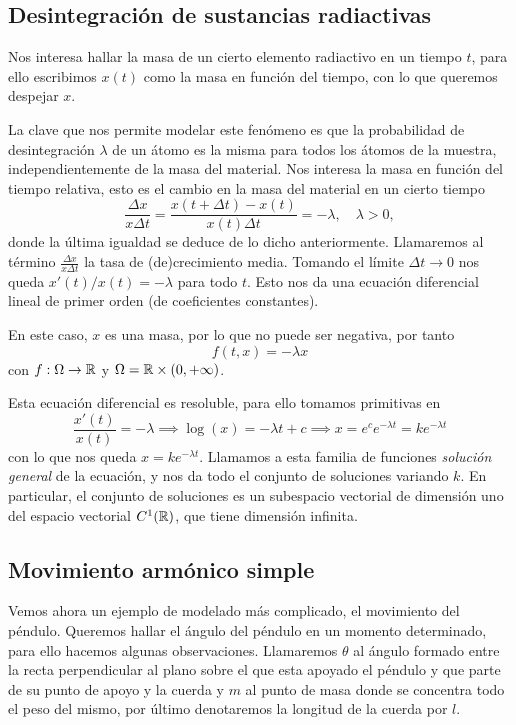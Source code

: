 \documentclass[../ecuaciones_diferenciales.tex]{subfiles}
\begin{document}
\subsection{Desintegración de sustancias radiactivas}

Nos interesa hallar la masa de un cierto elemento radiactivo en un tiempo \(t\),
para ello escribimos \(x(t)\) como la masa en función del tiempo, con lo que
queremos despejar \(x\).

La clave que nos permite modelar este fenómeno es que la probabilidad de 
desintegración \(\lambda\) de un átomo es la misma para todos los átomos de la 
muestra, independientemente de la masa del material.
Nos interesa la masa en función del tiempo relativa, esto es el cambio en la
masa del material en un cierto tiempo
\[\frac{\Delta x}{x \Delta t} = \frac{x(t + \Delta t) - x(t)}{x(t) \Delta t}
	= -\lambda, \quad \lambda > 0,\] 
donde la última igualdad se deduce de lo dicho anteriormente. 
Llamaremos al término \(\frac{\Delta x}{x\Delta t}\) la tasa de
(de)crecimiento media. Tomando el límite \(\Delta t \to 0\) nos queda
\(x'(t)/x(t) = -\lambda\) para todo \(t\). Esto nos da una ecuación diferencial
lineal de primer orden (de coeficientes constantes).

En este caso, \(x\) es una masa, por lo que no puede ser negativa, por tanto
\[f(t, x) = -\lambda x\]
con \(f : \Omega \to \mathbb{R}\) y \(\Omega = \mathbb{R} \times (0, +\infty)\).

Esta ecuación diferencial es resoluble, para ello tomamos primitivas en
\[\frac{x'(t)}{x(t)} = -\lambda \implies \log(x) = -\lambda t + c
	\implies x = e^c e^{-\lambda t} = k e^{-\lambda t}\] con lo que nos queda
\(x = k e^{-\lambda t}\). Llamamos a esta familia de funciones \emph{solución general}
de la ecuación, y nos da todo el conjunto de soluciones variando \(k\). En
particular, el conjunto de soluciones es un subespacio vectorial de dimensión
uno del espacio vectorial \(C^1(\mathbb{R})\), que tiene dimensión infinita.

\subsection{Movimiento armónico simple} 

Vemos ahora un ejemplo de modelado más complicado, el movimiento del péndulo.
Queremos hallar el ángulo del péndulo en un momento determinado, para ello
hacemos algunas observaciones. Llamaremos \(\theta\) al ángulo
formado entre la recta perpendicular al plano sobre el que esta apoyado el
péndulo y que parte de su punto de apoyo y la cuerda y \(m\) al punto de masa
donde se concentra todo el peso del mismo, por último denotaremos la longitud
de la cuerda por \(l\). 
\end{document}
